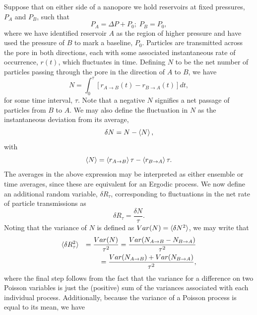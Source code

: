 \documentclass[%
 reprint,
 aps,
 prb,
 epsf,
]{revtex4-2}
\begin{document}
Suppose that on either side of a nanopore we hold reservoirs at fixed pressures, $P_A$ and $P_B$, such that 
\begin{equation}
    P_A =  \Delta P+ P_0 ;\; P_B = P_0,
\end{equation}
where we have identified reservoir $A$ as the region of higher pressure and have used the pressure of $B$ to mark a baseline, $P_0$. Particles are transmitted across the pore in both directions, each with some associated instantaneous rate of occurrence, $r(t)$, which fluctuates in time. Defining $N$ to be the net number of particles passing through the pore in the direction of $A$ to $B$, we have
\begin{equation}
    N = \int_0^\tau [r_{A\rightarrow B}(t)  -  r_{B \rightarrow A}(t)]dt,
\end{equation}
for some time interval, $\tau$. Note that a negative $N$ signifies a net passage of particles from $B$ to $A$. We may also define the fluctuation in $N$ as the instantaneous deviation from its average, 
\begin{equation}
    \delta N = N - \braket{N},
\end{equation}
with 
\begin{equation}
    \braket{N} = \braket{r_{A\rightarrow B}}\tau  - \braket{r_{B\rightarrow A}}\tau.
\end{equation}
The averages in the above expression may be interpreted as either ensemble or time averages, since these are equivalent for an Ergodic process. We now define an additional random variable, $\delta R_\tau$, corresponding to fluctuations in the net rate of particle transmissions as
\begin{equation}
    \delta R_\tau = \frac{\delta N}{\tau}.
\end{equation}
Noting that the variance of $N$ is defined as $Var(N) = \braket{\delta N^2}$, we may write that 
\begin{eqnarray}
\label{eq:7}
    \braket{\delta R_\tau^2} &&= \frac{Var (N)}{\tau^2} = \frac{Var (N_{A\rightarrow B} - N_{B \rightarrow A})}{\tau^2}\\
    &&= \frac{ Var(N_{A\rightarrow B}) + Var(N_{B\rightarrow A})}{\tau^2},
\end{eqnarray}
where the final step follows from the fact that the variance for a difference on two Poisson variables is just the (positive) sum of the variances associated with each individual process. Additionally, because the variance of a Poisson process is equal to its mean, we have
\end{document}
